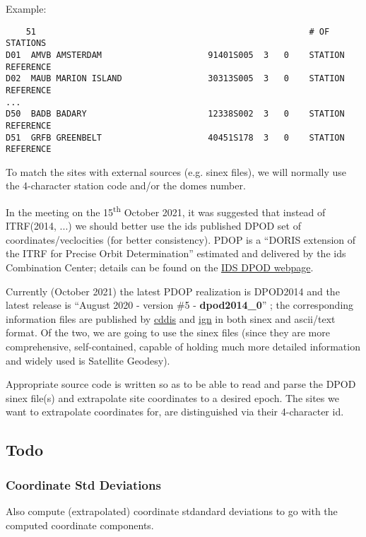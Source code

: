 Example:

\begin{adjustbox}{max width=\linewidth , fbox=0.5pt}
\begin{BVerbatim}
    51                                                      # OF STATIONS
D01  AMVB AMSTERDAM                     91401S005  3   0    STATION REFERENCE
D02  MAUB MARION ISLAND                 30313S005  3   0    STATION REFERENCE
...
D50  BADB BADARY                        12338S002  3   0    STATION REFERENCE 
D51  GRFB GREENBELT                     40451S178  3   0    STATION REFERENCE
\end{BVerbatim}
\end{adjustbox}

To match the sites with external sources (e.g. \gls{sinex} files), we will 
normally use the 4-character station code and/or the domes number.

In the meeting on the 15\textsuperscript{th} October 2021, it was suggested 
that instead of ITRF(2014, ...) we should better use the \gls{ids} published DPOD 
set of coordinates/veclocities (for better consistency). PDOP is a 
``DORIS extension of the ITRF for Precise Orbit Determination'' estimated and 
delivered by the \gls{ids} Combination Center; details can be found on the 
\href{https://ids-doris.org/analysis-coordination/combination/dpod.html}{IDS DPOD webpage}.

Currently (October 2021) the latest PDOP realization is DPOD2014 
\cite{Moreaux2019118} and the latest release is 
``August 2020 - version \#5 - \textbf{dpod2014\_0}'' \cite{Moreaux2020};
the corresponding information files are published by 
\href{ftp://cddis.gsfc.nasa.gov/pub/doris/products/dpod/dpod2014/}{cddis} and
\href{ftp://doris.ensg.ign.fr/pub/doris/products/dpod/dpod2014/}{ign} in both 
\gls{sinex} and ascii/text format. Of the two, we are going to use the 
\gls{sinex} files (since they are more comprehensive, self-contained, capable 
of holding much more detailed information and widely used is Satellite Geodesy). 

Appropriate source code is written so as to be able to read and parse the DPOD 
\gls{sinex} file(s) and extrapolate site coordinates to a desired epoch. The 
sites we want to extrapolate coordinates for, are distinguished via their 
4-character id.

\subsection{Todo}
\subsubsection{Coordinate Std Deviations}
Also compute (extrapolated) coordinate stdandard deviations to go with the 
computed coordinate components.

